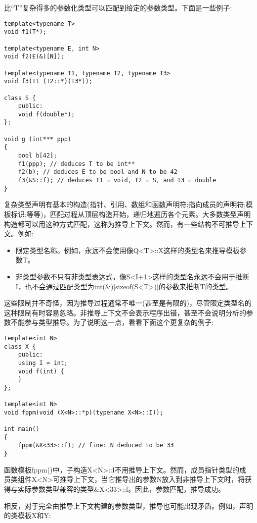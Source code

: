 比“T”复杂得多的参数化类型可以匹配到给定的参数类型。下面是一些例子:

\begin{lstlisting}[style=styleCXX]
template<typename T>
void f1(T*);

template<typename E, int N>
void f2(E(&)[N]);

template<typename T1, typename T2, typename T3>
void f3(T1 (T2::*)(T3*));

class S {
	public:
	void f(double*);
};

void g (int*** ppp)
{
	bool b[42];
	f1(ppp); // deduces T to be int**
	f2(b); // deduces E to be bool and N to be 42
	f3(&S::f); // deduces T1 = void, T2 = S, and T3 = double
}
\end{lstlisting} 

复杂类型声明有基本的构造(指针、引用、数组和函数声明符;指向成员的声明符;模板标识;等等)，匹配过程从顶层构造开始，递归地遍历各个元素。大多数类型声明构造都可以用这种方式匹配，这称为推导上下文。然而，有一些结构不可推导上下文。例如:

\begin{itemize}
\item 
限定类型名称。例如，永远不会使用像Q<T>::X这样的类型名来推导模板参数T。

\item 
非类型参数不只有非类型表达式，像S<I+1>这样的类型名永远不会用于推断I，也不会通过匹配类型为int(\&)[sizeof(S<T>)]的参数来推断T的类型。
\end{itemize}

这些限制并不奇怪，因为推导过程通常不唯一(甚至是有限的)，尽管限定类型名的这种限制有时容易忽略。非推导上下文不会表示程序出错，甚至不会说明分析的参数不能参与类型推导。为了说明这一点，看看下面这个更复杂的例子:

\begin{lstlisting}[style=styleCXX]
template<int N>
class X {
	public:
	using I = int;
	void f(int) {
	}
};

template<int N>
void fppm(void (X<N>::*p)(typename X<N>::I));

int main()
{
	fppm(&X<33>::f); // fine: N deduced to be 33
}
\end{lstlisting}

函数模板fppm()中，子构造X<N>::I不用推导上下文。然而，成员指针类型的成员类组件X<N>可推导上下文，当它推导出的参数N放入到非推导上下文时，将获得与实际参数类型兼容的类型\&X<33>::f。因此，参数匹配，推导成功。

相反，对于完全由推导上下文构建的参数类型，推导也可能出现矛盾。例如，声明的类模板X和Y:

